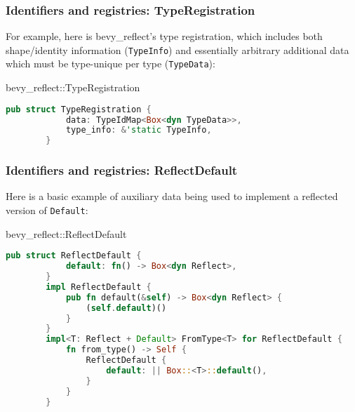 \documentclass[10pt]{beamer}
\begin{document}
\begin{frame}[fragile]
    \frametitle{Identifiers and registries: TypeRegistration}
    For example, here is bevy\_reflect's type registration, which includes both shape/identity information (\texttt{TypeInfo}) and essentially arbitrary additional data which must be type-unique per type (\texttt{TypeData}):
    
	\begin{block}{bevy\_reflect::TypeRegistration}
	\begin{lstlisting}[language=Rust, gobble=8]
        pub struct TypeRegistration {
            data: TypeIdMap<Box<dyn TypeData>>,
            type_info: &'static TypeInfo,
        }
	\end{lstlisting}
	\end{block}
    
\end{frame}

\begin{frame}[fragile]
    \frametitle{Identifiers and registries: ReflectDefault}
    Here is a basic example of auxiliary data being used to implement a reflected version of \texttt{Default}:
    
	\begin{block}{bevy\_reflect::ReflectDefault}
	\begin{lstlisting}[language=Rust, gobble=8]
        pub struct ReflectDefault {
            default: fn() -> Box<dyn Reflect>,
        }
        impl ReflectDefault {
            pub fn default(&self) -> Box<dyn Reflect> {
                (self.default)()
            }
        }
        impl<T: Reflect + Default> FromType<T> for ReflectDefault {
            fn from_type() -> Self {
                ReflectDefault {
                    default: || Box::<T>::default(),
                }
            }
        }
	\end{lstlisting}
	\end{block}
\end{frame}
\end{document}
